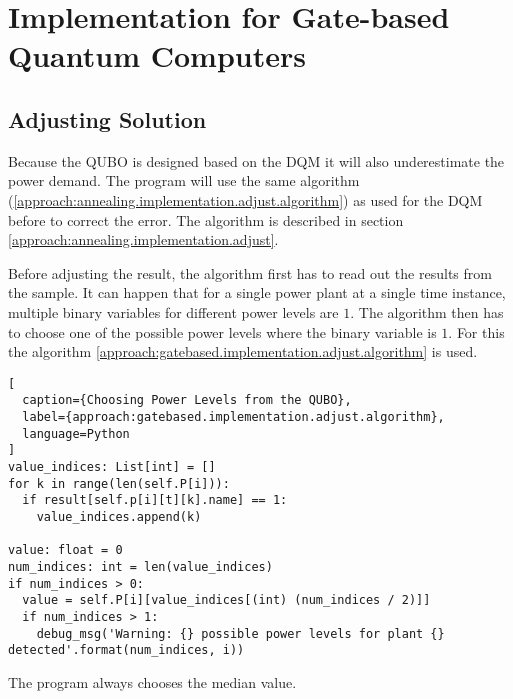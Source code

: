 \section{Implementation for Gate-based Quantum Computers}


\subsection{Adjusting Solution}

Because the QUBO is designed based on the DQM it will also underestimate the power demand.
The program will use the same algorithm (\ref{approach:annealing.implementation.adjust.algorithm}) as used for the DQM before to correct the error.
The algorithm is described in section \ref{approach:annealing.implementation.adjust}.

Before adjusting the result, the algorithm first has to read out the results from the sample.
It can happen that for a single power plant at a single time instance, multiple binary variables for different power levels are $1$.
The algorithm then has to choose one of the possible power levels where the binary variable is $1$.
For this the algorithm \ref{approach:gatebased.implementation.adjust.algorithm} is used.

\begin{lstlisting}[
  caption={Choosing Power Levels from the QUBO},
  label={approach:gatebased.implementation.adjust.algorithm},
  language=Python
]
value_indices: List[int] = []
for k in range(len(self.P[i])):
  if result[self.p[i][t][k].name] == 1:
    value_indices.append(k)

value: float = 0
num_indices: int = len(value_indices)
if num_indices > 0:
  value = self.P[i][value_indices[(int) (num_indices / 2)]]
  if num_indices > 1:
    debug_msg('Warning: {} possible power levels for plant {} detected'.format(num_indices, i))
\end{lstlisting}

The program always chooses the median value.
